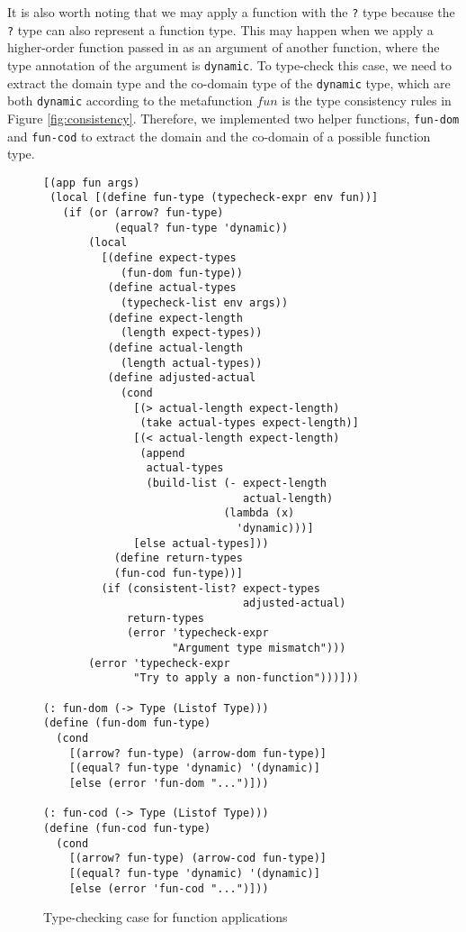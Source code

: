 It is also worth noting that we may apply a function with the {\tt ?} type because the {\tt ?} type can also represent a function type. This may happen when we apply a higher-order function passed in as an argument of another function, where the type annotation of the argument is {\tt dynamic}. To type-check this case, we need to extract the domain type and the co-domain type of the {\tt dynamic} type, which are both {\tt dynamic} according to the metafunction $fun$ is the type consistency rules in Figure \ref{fig:consistency}. Therefore, we implemented two helper functions, {\tt fun-dom} and {\tt fun-cod} to extract the domain and the co-domain of a possible function type.

\begin{figure}[h]
    \begin{lstlisting}[language=racket]
[(app fun args)
 (local [(define fun-type (typecheck-expr env fun))]
   (if (or (arrow? fun-type)
           (equal? fun-type 'dynamic))
       (local
         [(define expect-types
            (fun-dom fun-type))
          (define actual-types
            (typecheck-list env args))
          (define expect-length
            (length expect-types))
          (define actual-length
            (length actual-types))
          (define adjusted-actual
            (cond
              [(> actual-length expect-length)
               (take actual-types expect-length)]
              [(< actual-length expect-length)
               (append
                actual-types
                (build-list (- expect-length
                               actual-length)
                            (lambda (x)
                              'dynamic)))]
              [else actual-types]))
           (define return-types
           (fun-cod fun-type))]
         (if (consistent-list? expect-types
                               adjusted-actual)
             return-types
             (error 'typecheck-expr
                    "Argument type mismatch")))
       (error 'typecheck-expr
              "Try to apply a non-function")))]))

(: fun-dom (-> Type (Listof Type)))
(define (fun-dom fun-type)
  (cond
    [(arrow? fun-type) (arrow-dom fun-type)]
    [(equal? fun-type 'dynamic) '(dynamic)]
    [else (error 'fun-dom "...")]))

(: fun-cod (-> Type (Listof Type)))
(define (fun-cod fun-type)
  (cond
    [(arrow? fun-type) (arrow-cod fun-type)]
    [(equal? fun-type 'dynamic) '(dynamic)]
    [else (error 'fun-cod "...")]))
    \end{lstlisting}
    \caption[]{Type-checking case for function applications}
    \label{fig:app}
\end{figure}

